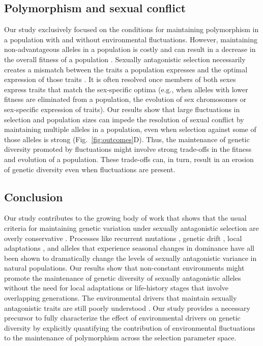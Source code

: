 \documentclass[12pt]{article}
\begin{document}
 \subsection*{Polymorphism and sexual conflict}

 Our study exclusively focused on the conditions for maintaining polymorphism in a population with and without environmental fluctuations. However, maintaining non-advantageous alleles in a population is costly and can result in a decrease in the overall fitness of a population \citep{gavrilets2014sexual,connallon2018environmental}. Sexually antagonistic selection necessarily creates a mismatch between the traits a population expresses and the optimal expression of those traits \citep{lande1980sexual}. It is often resolved once members of both sexes express traits that match the sex-specific optima (e.g., when alleles with lower fitness are eliminated from a population, the evolution of sex chromosomes or sex-specific expression of traits)\citep{lande1980sexual, arnqvist2013sexual}. Our results show that large fluctuations in selection and population sizes can impede the resolution of sexual conflict by maintaining multiple alleles in a population, even when selection against some of those alleles is strong (Fig.~\ref{fig:outcomes}D). Thus, the maintenance of genetic diversity promoted by fluctuations might involve strong trade-offs in the fitness and evolution of a population. These trade-offs can, in turn, result in an erosion of genetic diversity even when fluctuations are present.


 \subsection*{Conclusion}
Our study contributes to the growing body of work that shows that the usual criteria for maintaining genetic variation under sexually antagonistic selection are overly conservative \citep{connallon2012general,connallon_evolutionary_2018}. Processes like recurrent mutations \citep{radwan_maintenance_2008}, genetic drift \citep{connallon2012general}, local adaptations \citep{connallon_evolutionary_2018}, and alleles that experience seasonal changes in dominance \citep{wittmann2017seasonally} have all been shown to dramatically change the levels of sexually antagonistic variance in natural populations. Our results show that non-constant environments might promote the maintenance of genetic diversity of sexually antagonistic alleles without the need for local adaptations or life-history stages that involve overlapping generations. The environmental drivers that maintain sexually antagonistic traits are still poorly understood \citep{connallon2018environmental}. Our study provides a necessary precursor to fully characterize the effect of environmental drivers on genetic diversity by explicitly quantifying the contribution of environmental fluctuations to the maintenance of polymorphism across the selection parameter space.
 \clearpage
\clearpage
\end{document}
